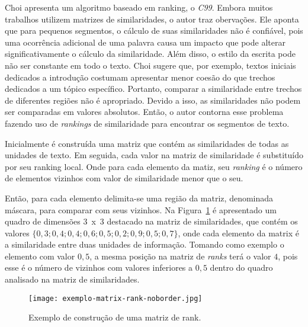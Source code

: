 
Choi \cite{Choi2000} apresenta um algoritmo baseado em ranking, o \textit{C99}. 
%
Embora muitos trabalhos utilizem matrizes de similaridades, o autor traz obervações.
%
Ele aponta que para pequenos segmentos, o cálculo de suas similaridades não é confiável, pois uma ocorrência adicional de uma palavra causa um impacto que pode alterar significativamente o cálculo da similaridade.
%
Além disso, o estilo da escrita pode não ser constante em todo o texto. Choi sugere que, por exemplo, textos iniciais dedicados a introdução costumam apresentar menor coesão do que trechos dedicados a um tópico específico. Portanto, comparar a similaridade entre trechos de diferentes regiões não é apropriado.
Devido a isso, as similaridades não podem ser comparadas em valores absolutos. Então, o autor contorna esse problema fazendo uso de \textit{rankings} de similaridade para encontrar os segmentos de texto. 


Inicialmente é construída uma matriz que contém as similaridades de todas as unidades de texto. Em seguida, cada valor na matriz de similaridade é substituído por seu ranking local. Onde para cada elemento da matiz, seu \textit{ranking} é o número de elementos vizinhos com valor de similaridade menor que o seu.

Então, para cada elemento delimita-se uma região da matriz, denominada máscara, para comparar com seus vizinhos.
%
Na Figura~\ref{fig:exemplomatrixrank} é apresentado um quadro de dimensões 3~x~3 destacado na matriz de similaridades, que contém os valores $\{0,3; 0,4; 0,4; 0,6; 0,5; 0,2; 0,9; 0,5; 0,7\}$, onde cada elemento da matrix é a similaridade entre duas unidades de informação. Tomando como exemplo o elemento com valor $0,5$, a mesma posição na matriz de \textit{ranks} terá o valor $4$, pois esse é o número de vizinhos com valores inferiores a $0,5$ dentro do quadro analisado na matriz de similaridades. 


  \begin{figure}[!h]

	\centering
	\texttt{[image: exemplo-matrix-rank-noborder.jpg]}
	\caption{Exemplo de construção de uma matriz de rank.~\cite{Choi2000}}
	\label{fig:exemplomatrixrank}

  \end{figure}



